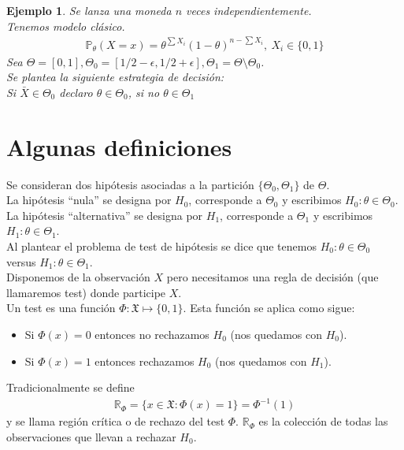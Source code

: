 \documentclass[10pt]{article}
\theoremstyle{plain}
\newtheorem{ej}{Ejemplo}
\theoremstyle{definition}
\begin{document}
 \begin{ej}
 Se lanza una moneda $n$ veces independientemente.\\
 Tenemos modelo clásico.
 \begin{align*}
 \mathbb{P}_{\theta}(X=x) = \theta^{\sum X_{i}}(1-\theta)^{n-\sum X_{i}},\ X_{i}\in \{0,1\}
 \end{align*}
 Sea $\Theta = [0,1], \Theta_{0} = [1/2-\epsilon, 1/2+\epsilon], \Theta_{1} = \Theta \setminus \Theta_{0}$.\\
 Se plantea la siguiente estrategia de decisión:\\
 Si $\bar{X}\in \Theta_{0}$ declaro $\theta \in \Theta_{0}$, si no $\theta\in \Theta_{1}$
 \end{ej}
 \section{Algunas definiciones}
 Se consideran dos hipótesis asociadas a la partición $\{\Theta_{0},\Theta_{1}\}$ de $\Theta$.\\
 La hipótesis ``nula'' se designa por $H_{0}$, corresponde a $\Theta_{0}$ y escribimos $H_{0}\colon \theta \in \Theta_{0}$.\\
 La hipótesis ``alternativa'' se designa por $H_{1}$, corresponde a $\Theta_{1}$ y escribimos $H_{1}\colon \theta \in \Theta_{1}$.\\
 
 Al plantear el problema de test de hipótesis se dice que tenemos $H_{0}\colon \theta \in \Theta_{0}$ versus $H_{1}\colon \theta \in \Theta_{1}$.\\
 
 Disponemos de la observación $X$ pero necesitamos una regla de decisión (que llamaremos test) donde participe $X$.\\
 
 Un test es una función $\Phi: \mathfrak{X}\mapsto\{0,1\}$. Esta función se aplica como sigue:
 \begin{itemize}
 \item Si $\Phi(x)=0$ entonces no rechazamos $H_{0}$ (nos quedamos con $H_{0}$).
 \item Si $\Phi(x)=1$ entonces rechazamos $H_{0}$ (nos quedamos con $H_{1}$).
 \end{itemize}
 Tradicionalmente se define
 \begin{align*}
 \mathbb{R}_{\Phi}= \{x\in \mathfrak{X}\colon \Phi(x)=1\} = \Phi^{-1}(1)
 \end{align*}
 y se llama región crítica o de rechazo del test $\Phi$. $\mathbb{R}_{\Phi}$ es la colección de todas las observaciones que llevan a rechazar $H_{0}$.
\end{document}
